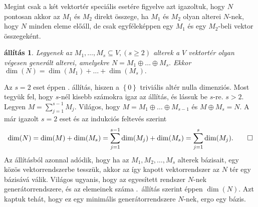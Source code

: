 \documentclass[9pt, a4paper, showtrims]{memoir}
\makeatletter
\renewenvironment{proof}[1][\proofname]
    {\par\pushQED{\qed}%
    \normalfont \topsep6\p@\@plus6\p@\relax
    \trivlist
    \item[\hskip\labelsep
        \itshape
    #1\@addpunct{:}]\ignorespaces}
    {\popQED\endtrivlist\@endpefalse}
\theoremstyle{plain}
\newtheorem{proposition}{állítás}[chapter]
\theoremstyle{remark}
\theoremstyle{definition}
\makeatother
\begin{document}
Megint csak a két vektortér speciális esetére figyelve
azt igazoltuk, hogy $N$ pontosan akkor az $M_1$ és $M_2$ direkt összege,
ha $M_1$ és $M_2$ olyan alterei $N$-nek, hogy $N$ minden eleme előáll,
de csak egyféleképpen egy $M_1$ és egy $M_2$-beli vektor összegeként.
\begin{proposition}\label{pr:drosszeg}
	Legyenek az $M_1,\ldots,M_s\subseteq V, (s\geq 2)$ alterek a $V$ vektortér olyan végesen generált alterei,
	amelyekre
	\(
	N=M_1\oplus\dots\oplus M_s.
	\)
	Ekkor
	\(
	\dim(N)=
	\dim(M_1)+\dots+\dim(M_s).
	\)
\end{proposition}
\begin{proof}
	Az $s=2$ eset éppen . állítás,
	hiszen a $\left\{ 0 \right\}$ triviális altér nulla dimenziós.
	Most tegyük fel, hogy $s$-nél kisebb számokra igaz az állítás,
	és lássuk be $s$-re. $s>2.$
	Legyen $M=\sum_{j=1}^{s-1}M_j.$
	Világos, hogy $M=M_1\oplus\dots\oplus M_{s-1}$ és $M\oplus M_s=N$.
	A már igazolt $s=2$ eset és az indukciós feltevés szerint
	\[
		\dim(N)
		=
		\dim(M)+\dim(M_s)
		=
		\sum_{j=1}^{s-1}\dim(M_j)+\dim(M_s)
		=
		\sum_{j=1}^{s}\dim(M_j).\qedhere
	\]
\end{proof}
Az állításból azonnal adódik,
hogy ha az $M_1, M_2, \dots,M_s$ alterek bázisait, egy közös vektorrendszerbe tesszük,
akkor az így kapott vektorrendszer az $N$ tér egy bázisává válik.
Világos ugyanis, hogy az egyesített rendszer $N$-nek generátorrendszere,
és az elemeinek száma .~állítás szerint éppen $\dim(N)$.
Azt kaptuk tehát, hogy ez egy minimális generátorrendszere $N$-nek,
ergo egy bázis.
\end{document}
